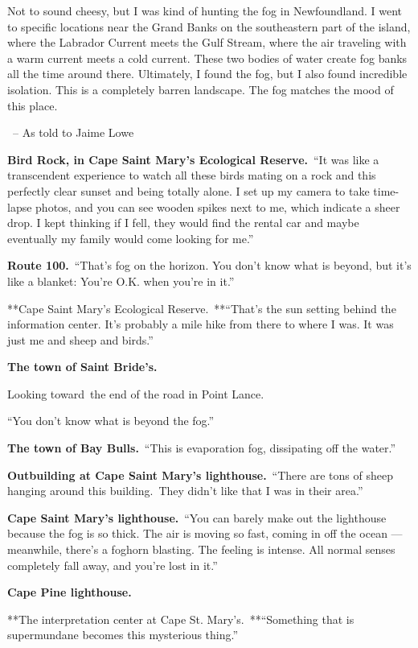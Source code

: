 Not to sound cheesy, but I was kind of hunting the fog in Newfoundland.
I went to specific locations near the Grand Banks on the southeastern
part of the island, where the Labrador Current meets the Gulf Stream,
where the air traveling with a warm current meets a cold current. These
two bodies of water create fog banks all the time around there.
Ultimately, I found the fog, but I also found incredible isolation. This
is a completely barren landscape. The fog matches the mood of this
place.

~-- As told to Jaime Lowe

\textbf{Bird Rock, in Cape Saint Mary's Ecological Reserve.}~``It was
like a transcendent experience to watch all these birds mating on a rock
and this perfectly clear sunset and being totally alone. I set up my
camera to take time-lapse photos, and you can see wooden spikes next to
me, which indicate a sheer drop. I kept thinking if I fell, they would
find the rental car and maybe eventually my family would come looking
for me.''

\textbf{Route 100.}~``That's fog on the horizon. You don't know what is
beyond, but it's like a blanket: You're O.K. when you're in it.''

**Cape Saint Mary's Ecological Reserve.~**``That's the sun setting
behind the information center. It's probably a mile hike from there to
where I was. It was just me and sheep and birds.''

\textbf{The town of Saint Bride's.}

Looking toward~the end of the road in Point Lance.~

``You don't know what is beyond the fog.''

\textbf{The town of Bay Bulls.}~``This is evaporation fog, dissipating
off the water.''

\textbf{Outbuilding at Cape Saint Mary's lighthouse.}~``There are tons
of sheep hanging around this building.~They didn't like that I was in
their area.''

\textbf{Cape Saint Mary's lighthouse.}~``You can barely make out the
lighthouse because the fog is so thick. The air is moving so fast,
coming in off the ocean --- meanwhile, there's a foghorn blasting. The
feeling is intense. All normal senses completely fall away, and you're
lost in it.''

\textbf{Cape Pine lighthouse.}

**The interpretation center at Cape St. Mary's.~**``Something that is
supermundane becomes this mysterious thing.''

